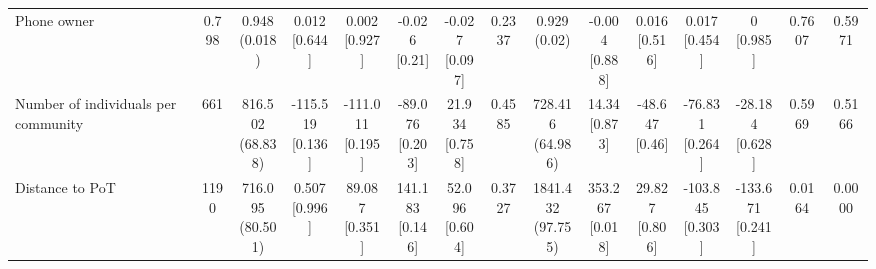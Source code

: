 {\begin{tabular}[t]{lcccccccccccccc}
\hspace{1em}Phone owner & 0.798 & \makecell[c]{0.948\\(0.018)} & \makecell[c]{0.012\\{[0.644]}} & \makecell[c]{0.002\\{[0.927]}} & \makecell[c]{-0.026\\{[0.21]}} & \makecell[c]{-0.027\\{[0.097]}} & 0.2337 & \makecell[c]{0.929\\(0.02)} & \makecell[c]{-0.004\\{[0.888]}} & \makecell[c]{0.016\\{[0.516]}} & \makecell[c]{0.017\\{[0.454]}} & \makecell[c]{0\\{[0.985]}} & 0.7607 & 0.5971\\
\hspace{1em}Number of individuals per community & 661 & \makecell[c]{816.502\\(68.838)} & \makecell[c]{-115.519\\{[0.136]}} & \makecell[c]{-111.011\\{[0.195]}} & \makecell[c]{-89.076\\{[0.203]}} & \makecell[c]{21.934\\{[0.758]}} & 0.4585 & \makecell[c]{728.416\\(64.986)} & \makecell[c]{14.34\\{[0.873]}} & \makecell[c]{-48.647\\{[0.46]}} & \makecell[c]{-76.831\\{[0.264]}} & \makecell[c]{-28.184\\{[0.628]}} & 0.5969 & 0.5166\\
\hspace{1em}Distance to PoT & 1190 & \makecell[c]{716.095\\(80.501)} & \makecell[c]{0.507\\{[0.996]}} & \makecell[c]{89.087\\{[0.351]}} & \makecell[c]{141.183\\{[0.146]}} & \makecell[c]{52.096\\{[0.604]}} & 0.3727 & \makecell[c]{1841.432\\(97.755)} & \makecell[c]{353.267\\{[0.018]}} & \makecell[c]{29.827\\{[0.806]}} & \makecell[c]{-103.845\\{[0.303]}} & \makecell[c]{-133.671\\{[0.241]}} & 0.0164 & 0.0000\\

\end{tabular}}
